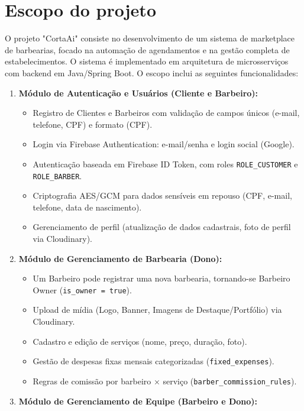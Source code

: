 \documentclass[
    12pt, 
    a4paper, 
    oneside, 
    chapter=TITLE, 
    section=TITLE
]{abntex2}
\begin{document}
\section{Escopo do projeto}
O projeto "CortaAi" consiste no desenvolvimento de um sistema de marketplace de barbearias, focado na automação de agendamentos e na gestão completa de estabelecimentos. O sistema é implementado em arquitetura de microsserviços com backend em Java/Spring Boot. O escopo inclui as seguintes funcionalidades:
\begin{enumerate}
    \item \textbf{Módulo de Autenticação e Usuários (Cliente e Barbeiro):}
        \begin{itemize}
            \item Registro de Clientes e Barbeiros com validação de campos únicos (e-mail, telefone, CPF) e formato (CPF).
            \item Login via Firebase Authentication: e-mail/senha e login social (Google).
            \item Autenticação baseada em Firebase ID Token, com roles \texttt{ROLE\_CUSTOMER} e \texttt{ROLE\_BARBER}.
            \item Criptografia AES/GCM para dados sensíveis em repouso (CPF, e-mail, telefone, data de nascimento).
            \item Gerenciamento de perfil (atualização de dados cadastrais, foto de perfil via Cloudinary).
        \end{itemize}
    \item \textbf{Módulo de Gerenciamento de Barbearia (Dono):}
        \begin{itemize}
            \item Um Barbeiro pode registrar uma nova barbearia, tornando-se Barbeiro Owner (\texttt{is\_owner = true}).
            \item Upload de mídia (Logo, Banner, Imagens de Destaque/Portfólio) via Cloudinary.
            \item Cadastro e edição de serviços (nome, preço, duração, foto).
            \item Gestão de despesas fixas mensais categorizadas (\texttt{fixed\_expenses}).
            \item Regras de comissão por barbeiro × serviço (\texttt{barber\_commission\_rules}).
        \end{itemize}
    \item \textbf{Módulo de Gerenciamento de Equipe (Barbeiro e Dono):}
        \begin{itemize}

\end{itemize}
\end{enumerate}
\end{document}
